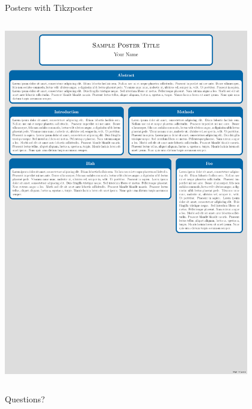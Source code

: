 \documentclass[aspectratio=1610]{beamer}
\let\oldfootnotesize\footnotesize
\renewcommand*{\footnotesize}{\oldfootnotesize\tiny}
\begin{document}
\begin{frame}[fragile]{Posters with Tikzposter}
 \begin{columns}[T]


      



      \includegraphics[width=0.8\textwidth, frame]{example_poster.pdf}

  \end{columns}
\end{frame}


\begin{frame}
  \centering
  \Huge Questions?
\end{frame}

\end{document}
